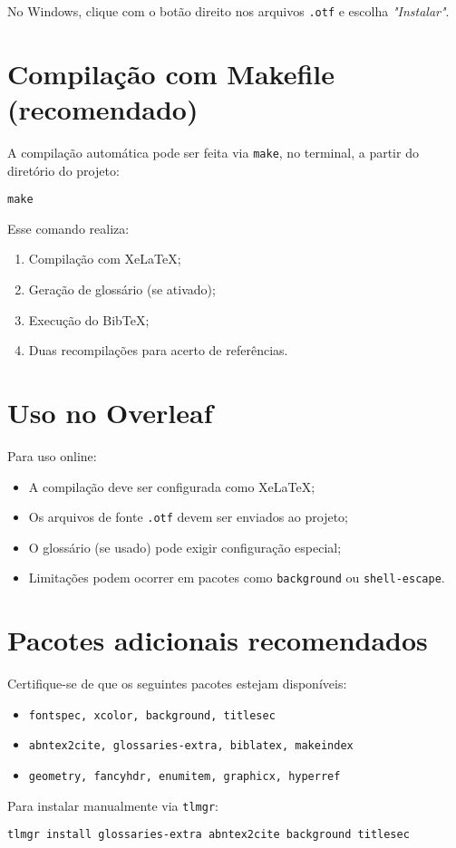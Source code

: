 No Windows, clique com o botão direito nos arquivos \texttt{.otf} e escolha \textit{"Instalar"}.

\section{Compilação com Makefile (recomendado)}

A compilação automática pode ser feita via \texttt{make}, no terminal, a partir do diretório do projeto:

\begin{verbatim}
make
\end{verbatim}

Esse comando realiza:
\begin{enumerate}
    \item Compilação com XeLaTeX;
    \item Geração de glossário (se ativado);
    \item Execução do BibTeX;
    \item Duas recompilações para acerto de referências.
\end{enumerate}

\section{Uso no Overleaf}

Para uso online:
\begin{itemize}
    \item A compilação deve ser configurada como XeLaTeX;
    \item Os arquivos de fonte \texttt{.otf} devem ser enviados ao projeto;
    \item O glossário (se usado) pode exigir configuração especial;
    \item Limitações podem ocorrer em pacotes como \texttt{background} ou \texttt{shell-escape}.
\end{itemize}

\section{Pacotes adicionais recomendados}

Certifique-se de que os seguintes pacotes estejam disponíveis:

\begin{itemize}
    \item \texttt{fontspec, xcolor, background, titlesec}
    \item \texttt{abntex2cite, glossaries-extra, biblatex, makeindex}
    \item \texttt{geometry, fancyhdr, enumitem, graphicx, hyperref}
\end{itemize}

Para instalar manualmente via \texttt{tlmgr}:

\begin{verbatim}
tlmgr install glossaries-extra abntex2cite background titlesec
\end{verbatim}


